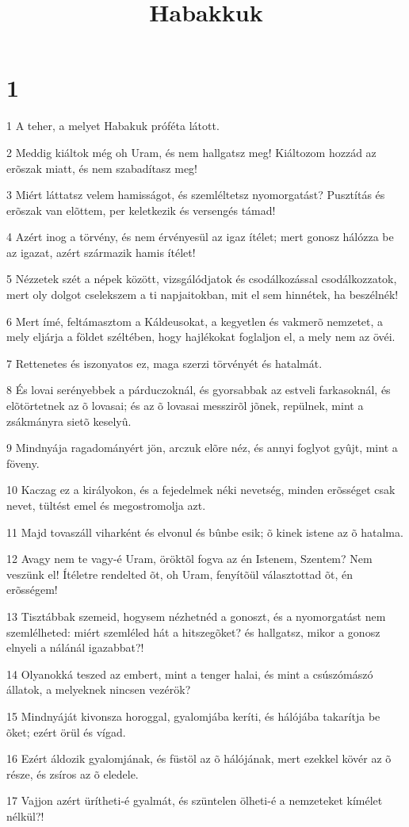 

\title{Habakkuk}


\chapter{1}

\par 1 A teher, a melyet Habakuk próféta látott.
\par 2 Meddig kiáltok még oh Uram, és nem hallgatsz meg! Kiáltozom hozzád az erõszak miatt, és nem szabadítasz meg!
\par 3 Miért láttatsz velem hamisságot, és szemléltetsz nyomorgatást? Pusztítás és erõszak van elõttem, per keletkezik és versengés támad!
\par 4 Azért inog a törvény, és nem érvényesül az igaz ítélet; mert gonosz hálózza be az igazat, azért származik hamis ítélet!
\par 5 Nézzetek szét a népek között, vizsgálódjatok és csodálkozással csodálkozzatok, mert oly dolgot cselekszem a ti napjaitokban, mit el sem hinnétek, ha beszélnék!
\par 6 Mert ímé, feltámasztom a Káldeusokat, a kegyetlen és vakmerõ nemzetet, a mely eljárja a földet széltében, hogy hajlékokat foglaljon el, a mely nem az övéi.
\par 7 Rettenetes és iszonyatos ez, maga szerzi törvényét és hatalmát.
\par 8 És lovai serényebbek a párduczoknál, és gyorsabbak az estveli farkasoknál, és elõtörtetnek az õ lovasai; és az õ lovasai messzirõl jõnek, repülnek, mint a zsákmányra sietõ keselyû.
\par 9 Mindnyája ragadományért jön, arczuk elõre néz, és annyi foglyot gyûjt, mint a föveny.
\par 10 Kaczag ez a királyokon, és a fejedelmek néki nevetség, minden erõsséget csak nevet, tültést emel és megostromolja azt.
\par 11 Majd tovaszáll viharként és elvonul és bûnbe esik; õ kinek istene az õ hatalma.
\par 12 Avagy nem te vagy-é Uram, öröktõl fogva az én Istenem, Szentem? Nem veszünk el! Ítéletre rendelted õt, oh Uram, fenyítõül választottad õt, én erõsségem!
\par 13 Tisztábbak szemeid, hogysem nézhetnéd a gonoszt, és a nyomorgatást nem szemlélheted: miért szemléled hát a hitszegõket? és hallgatsz, mikor a gonosz elnyeli a nálánál igazabbat?!
\par 14 Olyanokká teszed az embert, mint a tenger halai, és mint a csúszómászó állatok, a melyeknek nincsen vezérök?
\par 15 Mindnyáját kivonsza horoggal, gyalomjába keríti, és hálójába takarítja be õket; ezért örül és vígad.
\par 16 Ezért áldozik gyalomjának, és füstöl az õ hálójának, mert ezekkel kövér az õ része, és zsíros az õ eledele.
\par 17 Vajjon azért ürítheti-é gyalmát, és szüntelen ölheti-é a nemzeteket kímélet nélkül?!

